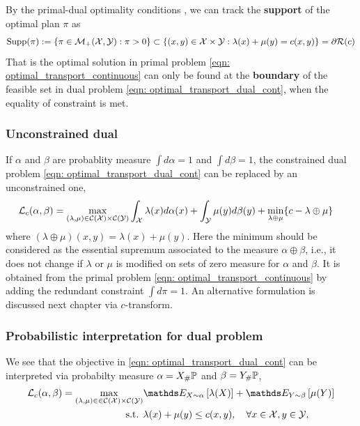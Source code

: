 \documentclass[11pt]{article}
\begin{document}
By the primal-dual optimality conditions , we can track the \textbf{support} of the optimal plan $\pi$ as
\begin{align}
\text{Supp}(\pi) := \left\{\pi \in {\mathcal M}_{+}({\mathcal X}, {\mathcal Y}): \pi > 0\right\} \subset \left\{(x, y) \in {\mathcal X} \times {\mathcal Y}:  \lambda(x) + \mu(y) = c(x, y)\right\} = \partial {\mathcal R}(c)  \label{eqn: support_of_optimal_transport_pi}
\end{align} That is the optimal solution in primal problem \eqref{eqn: optimal_transport_continuous} can only be found at the \textbf{boundary} of the feasible set in dual problem \eqref{eqn: optimal_transport_dual_cont}, when the equality of constraint is met.

\subsubsection{Unconstrained dual}
If $\alpha$ and $\beta$ are probablity measure $\int d\alpha =1$ and $\int d\beta = 1$, the constrained dual problem \eqref{eqn: optimal_transport_dual_cont} can be replaced by an unconstrained one,
\begin{align}
{\mathcal L}_{c}(\alpha, \beta) = \max_{(\lambda, \mu) \in {\mathcal C}({\mathcal X})\times {\mathcal C}({\mathcal Y})} & \int_{{\mathcal X}}\lambda(x) d\alpha(x) + \int_{{\mathcal Y}}\mu(y) d\beta(y) + \min_{\lambda\oplus\mu}\{c -\lambda\oplus \mu \} \label{eqn: optimal_transport_dual_uncontrained}
\end{align} where $(\lambda\oplus\mu)(x, y) = \lambda(x) + \mu(y)$. Here the minimum should be considered as the essential supremum associated to the measure $\alpha \oplus \beta$, i.e., it does not change if $\lambda$ or $\mu$ is modified on sets of zero measure for $\alpha$ and $\beta$. It is obtained from the primal problem \eqref{eqn: optimal_transport_continuous} by adding the redundant constraint $\int d\pi = 1$. An alternative formulation is discussed next chapter via $c$-transform.

\subsubsection{Probabilistic interpretation for dual problem}
We see that the objective in \eqref{eqn: optimal_transport_dual_cont} can be interpreted via probabilty measure $\alpha = X_{\#}{\mathbb P}$ and $\beta = Y_{\#}{\mathbb P}$, 
\begin{align}
\cL_{c}(\alpha, \beta) = \max_{(\lambda,  \mu) \in \in \cC(\cX)\times \cC(\cY)} & \E{X\sim \alpha}{\lambda(X)} + \E{Y \sim \beta}{\mu(Y)} \label{eqn: optimal_transport_dual_prob} \\
\text{s.t. }&  \lambda(x) + \mu(y) \le c(x, y),\quad \forall x\in \cX, y \in \cY, \nonumber
\end{align}
\end{document}
